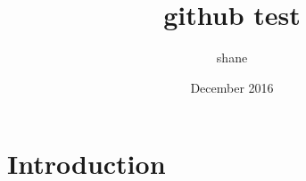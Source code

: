 \documentclass{article}
\title{github test}
\author{shane }
\date{December 2016}
\begin{document}
\maketitle

\section{Introduction}
\end{document}

